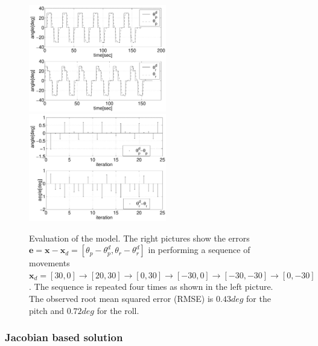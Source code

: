 \documentclass[conference]{IEEEtran}
\numberwithin{equation}{section}
\newcommand{\x}{\mathbf{x}}
\begin{document}
\begin{figure}[tbp]
\centering 
\includegraphics[width=60mm]{image/AngleModel.pdf} 
\includegraphics[width=60mm]{image/ErrorsModel.pdf} 
\caption{Evaluation of the model. The right pictures show the errors $\mathbf e = \x - \x_d = [\theta_p - \theta_p^d, \theta_r - \theta_r^d]$ in performing a sequence of movements $\x_d = [30, 0] \rightarrow[20, 30] \rightarrow[0, 30] \rightarrow[-30, 0] \rightarrow[-30, -30] \rightarrow[0, -30]$. The sequence is repeated four times as shown in the left picture. The observed root mean squared error (RMSE) is $0.43deg$ for the pitch and $0.72deg$ for the roll.}
\label{Fig:ErrorModel}
\end{figure}

\subsubsection{Jacobian based solution} \label{Sec:JacobianSolution}
\end{document}
